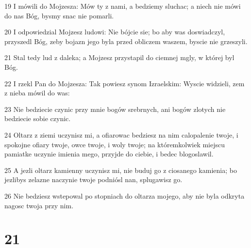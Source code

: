 \par 19 I mówili do Mojzesza: Mów ty z nami, a bedziemy sluchac; a niech nie mówi do nas Bóg, bysmy snac nie pomarli.
\par 20 I odpowiedzial Mojzesz ludowi: Nie bójcie sie; bo aby was doswiadczyl, przyszedl Bóg, zeby bojazn jego byla przed obliczem waszem, byscie nie grzeszyli.
\par 21 Stal tedy lud z daleka; a Mojzesz przystapil do ciemnej mgly, w której byl Bóg.
\par 22 I rzekl Pan do Mojzesza: Tak powiesz synom Izraelskim: Wyscie widzieli, zem z nieba mówil do was:
\par 23 Nie bedziecie czynic przy mnie bogów srebrnych, ani bogów zlotych nie bedziecie sobie czynic.
\par 24 Oltarz z ziemi uczynisz mi, a ofiarowac bedziesz na nim calopalenie twoje, i spokojne ofiary twoje, owce twoje, i woly twoje; na któremkolwiek miejscu pamiatke uczynie imienia mego, przyjde do ciebie, i bedec blogoslawil.
\par 25 A jezli oltarz kamienny uczynisz mi, nie buduj go z ciosanego kamienia; bo jezlibys zelazne naczynie twoje podniósl nan, splugawisz go.
\par 26 Nie bedziesz wstepowal po stopniach do oltarza mojego, aby nie byla odkryta nagosc twoja przy nim.

\chapter{21}

